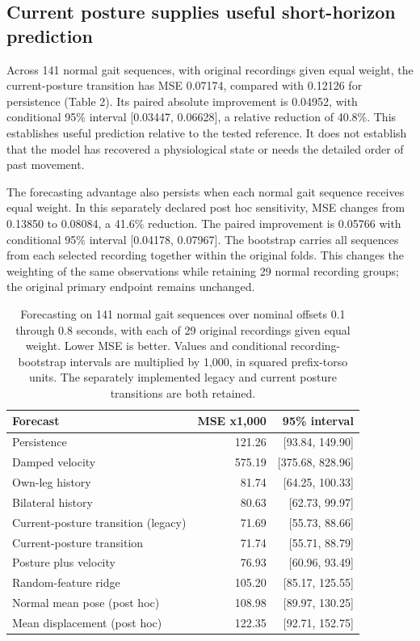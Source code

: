 \documentclass[letterpaper]{article}
\begin{document}
\subsection{Current posture supplies useful short-horizon prediction}

Across 141 normal gait sequences, with original recordings given equal weight, the current-posture transition has MSE 0.07174, compared with 0.12126 for persistence (Table 2). Its paired absolute improvement is 0.04952, with conditional 95\% interval [0.03447, 0.06628], a relative reduction of 40.8\%. This establishes useful prediction relative to the tested reference. It does not establish that the model has recovered a physiological state or needs the detailed order of past movement.

The forecasting advantage also persists when each normal gait sequence receives equal weight. In this separately declared post hoc sensitivity, MSE changes from 0.13850 to 0.08084, a 41.6\% reduction. The paired improvement is 0.05766 with conditional 95\% interval [0.04178, 0.07967]. The bootstrap carries all sequences from each selected recording together within the original folds. This changes the weighting of the same observations while retaining 29 normal recording groups; the original primary endpoint remains unchanged.

\begin{table}[t]
\centering
\footnotesize
\setlength{\tabcolsep}{3pt}
\begin{tabular}{>{\raggedright\arraybackslash}p{}rr}
\toprule
Forecast & MSE x1,000 & 95\% interval \\
\midrule
Persistence & 121.26 & [93.84, 149.90] \\
Damped velocity & 575.19 & [375.68, 828.96] \\
Own-leg history & 81.74 & [64.25, 100.33] \\
Bilateral history & 80.63 & [62.73, 99.97] \\
Current-posture transition (legacy) & 71.69 & [55.73, 88.66] \\
Current-posture transition & 71.74 & [55.71, 88.79] \\
Posture plus velocity & 76.93 & [60.96, 93.49] \\
Random-feature ridge & 105.20 & [85.17, 125.55] \\
Normal mean pose (post hoc) & 108.98 & [89.97, 130.25] \\
Mean displacement (post hoc) & 122.35 & [92.71, 152.75] \\
\bottomrule
\end{tabular}
\caption{Forecasting on 141 normal gait sequences over nominal offsets 0.1 through 0.8 seconds, with each of 29 original recordings given equal weight. Lower MSE is better. Values and conditional recording-bootstrap intervals are multiplied by 1,000, in squared prefix-torso units. The separately implemented legacy and current posture transitions are both retained.}
\label{tab:forecasts}
\end{table}
\end{document}
